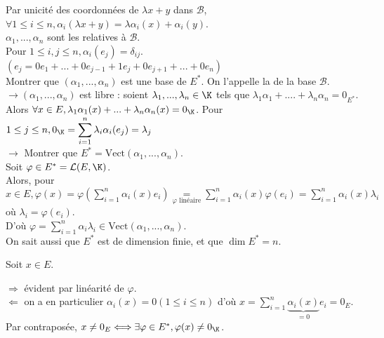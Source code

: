 \documentclass[12pt, a4paper]{report}
\begin{document}
Par unicité des coordonnées de $\lambda x + y$ dans $\mathcal{B}$, $\forall 1 \le i \le n, \alpha_i(\lambda x + y) = \lambda \alpha_i(x) + \alpha_i(y)$. \\

$\alpha_1,...,\alpha_n$ sont les  relatives à $\mathcal{B}$. \\
Pour $1 \le i,j \le n, \alpha_i(e_j) = \delta_{ij}$. $(e_j = 0e_1+...+0e_{j-1}+1e_j + 0e_{j+1}+...+0e_n)$ \\
Montrer que $(\alpha_1,...,\alpha_n)$ est une base de $E^*$. On l'appelle la  de la base $\mathcal{B}$. \\

$\longrightarrow (\alpha_1,...,\alpha_n)$ est libre : soient $\lambda_1,...,\lambda_n \in \K$ tels que $\lambda_1\alpha_1+....+\lambda_n\alpha_n = 0_{E^*}$. \\
Alors $\forall x \in E, \lambda_1\alpha_1(x) + ... + \lambda_n\alpha_n(x) = 0_{\K}$.
Pour $1 \le j \le n, 0_\K = \displaystyle{\sum_{i=1}^n \lambda_i \alpha_i(e_j)} = \lambda_j$ \\

$\longrightarrow$ Montrer que $E^* = \text{Vect}(\alpha_1,...,\alpha_n)$. \\
Soit $\varphi \in E^* = \mathcal{L}(E,\K)$. \\
Alors, pour $x \in E, \varphi(x) = \varphi \left(\displaystyle{\sum_{i=1}^n \alpha_i(x)e_i}\right) \underset{\varphi \text{ linéaire}}{=} \displaystyle{\sum_{i=1}^n \alpha_i(x) \varphi(e_i) = \sum_{i=1}^n \alpha_i(x) \lambda_i}$ où $\lambda_i = \varphi(e_i)$. \\

D'où $\varphi = \displaystyle{\sum_{i=1}^n \alpha_i \lambda_i} \in \text{Vect}(\alpha_1,...,\alpha_n)$. \\

On sait aussi que $E^*$ est de dimension finie, et que $\dim E^* = n$.

\begin{remarque}
Soit $x \in E$.
\begin{center}
\end{center}
$\Longrightarrow$ évident par linéarité de $\varphi$. \\
$\Longleftarrow$ on a en particulier $\alpha_i(x) = 0 (1 \le i \le n)$ d'où $x = \displaystyle{\sum_{i=1}^n \underbrace{\alpha_i(x)}_{=0} e_i}= 0_E$. \\

Par contraposée, $x \ne 0_E \Longleftrightarrow \exists \varphi \in E^*, \varphi(x) \ne 0_\K$.

\end{remarque}
\end{document}
